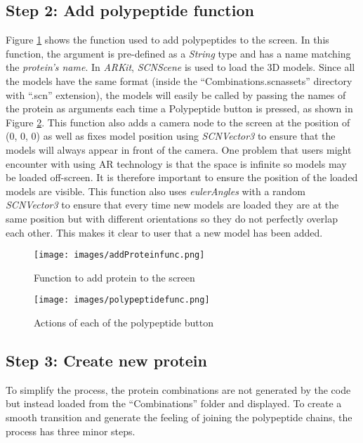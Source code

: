 \subsection{Step 2: Add polypeptide function}
Figure \ref{fig:addProteinfunc} shows the function used to add polypeptides to the screen. In this function, the argument is pre-defined as a \emph{String} type and has a name matching the \emph{protein's name}. In \emph{ARKit}, \emph{SCNScene} is used to load the 3D models. Since all the models have the same format (inside the “Combinations.scnassets” directory with “.scn” extension), the models will easily be called by passing the names of the protein as arguments each time a Polypeptide button is pressed, as shown in Figure \ref{fig:polypeptidefunc}. 
This function also adds a camera node to the screen at the position of (0, 0, 0) as well as fixes model position using \emph{SCNVector3} to ensure that the models will always appear in front of the camera. One problem that users might encounter with using AR technology is that the space is infinite so models may be loaded off-screen. It is therefore important to ensure the position of the loaded models are visible. This function also uses \emph{eulerAngles} with a random \emph{SCNVector3} to ensure that every time new models are loaded they are at the same position but with different orientations so they do not perfectly overlap each other. This makes it clear to user that a new model has been added.
\begin{figure}[!htp]
	\centering
	\texttt{[image: images/addProteinfunc.png]}
	\caption{Function to add protein to the screen}
	\label{fig:addProteinfunc}
\end{figure}

\begin{figure}[!htp]
	\centering
	\texttt{[image: images/polypeptidefunc.png]}
	\caption{Actions of each of the polypeptide button}
	\label{fig:polypeptidefunc}
\end{figure}


\subsection{Step 3: Create new protein}
To simplify the process, the protein combinations are not generated by the code but instead loaded from the “Combinations” folder and displayed. To create a smooth transition and generate the feeling of joining the polypeptide chains, the process has three minor steps. 

